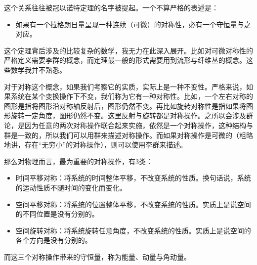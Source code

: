 \documentclass{ctexart}
\begin{document}
这个关系往往被冠以诺特定理的名字被提起。一个不算严格的表述是：
\begin{itemize}
\item 如果有一个拉格朗日量呈现一种连续（可微）的对称性，必有一个守恒量与之对应。
\end{itemize}

这个定理背后涉及的比较复杂的数学，我无力在此深入展开。比如对可微对称性的严格定义需要李群的概念，而定理最一般的形式需要用到流形与纤维丛的概念。这些数学我并不熟悉。

对于对称这个概念，如果我们考察它的实质，实际上是一种不变性。严格来说，如果系统在某个变换操作下不变，我们称为它有一种对称性。比如，一个左右对称的图形是指将图形沿对称轴反射后，图形仍然不变。再比如旋转对称性是指如果将图形旋转一定角度，图形仍然不变。这里反射与旋转都是对称操作。之所以会涉及群论，是因为任意的两次对称操作联合起来实施，依然是一个对称操作，这种结构与群是一致的，所以我们可以用群来描述对称操作。而如果对称操作是可微的（粗略地讲，存在“无穷小”的对称操作），则可以使用李群来描述。

那么对物理而言，最为重要的对称操作，有3类：
\begin{itemize}
\item 时间平移对称：将系统的时间整体平移，不改变系统的性质。换句话说，系统的运动性质不随时间的变化而变化。
\item 空间平移对称：将系统的位置整体平移，不改变系统的性质。实质上是说空间的不同位置是没有分别的。
\item 空间旋转对称：将系统旋转任意角度，不改变系统的性质。实质上是说空间的各个方向是没有分别的。
\end{itemize}
而这三个对称操作带来的守恒量，称为能量、动量与角动量。
\end{document}
